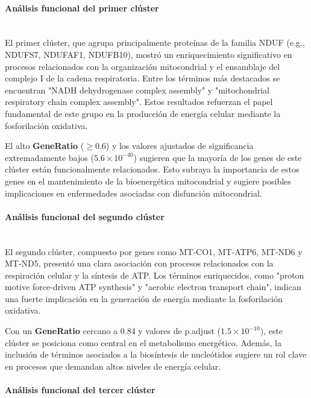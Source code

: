\paragraph{Análisis funcional del primer clúster} \mbox{}\\

El primer clúster, que agrupa principalmente proteínas de la familia NDUF (e.g., NDUFS7, NDUFAF1, NDUFB10), mostró un enriquecimiento significativo en procesos relacionados con la organización mitocondrial y el ensamblaje del complejo I de la cadena respiratoria. Entre los términos más destacados se encuentran "NADH dehydrogenase complex assembly" y "mitochondrial respiratory chain complex assembly". Estos resultados refuerzan el papel fundamental de este grupo en la producción de energía celular mediante la fosforilación oxidativa.

El alto \textbf{GeneRatio} (\(\geq 0.6\)) y los valores ajustados de significancia extremadamente bajos (\( 5.6 \times 10^{-40} \)) sugieren que la mayoría de los genes de este clúster están funcionalmente relacionados. Esto subraya la importancia de estos genes en el mantenimiento de la bioenergética mitocondrial y sugiere posibles implicaciones en enfermedades asociadas con disfunción mitocondrial.

\paragraph{Análisis funcional del segundo clúster} \mbox{}\\

El segundo clúster, compuesto por genes como MT-CO1, MT-ATP6, MT-ND6 y MT-ND5, presentó una clara asociación con procesos relacionados con la respiración celular y la síntesis de ATP. Los términos enriquecidos, como "proton motive force-driven ATP synthesis" y "aerobic electron transport chain", indican una fuerte implicación en la generación de energía mediante la fosforilación oxidativa.

Con un \textbf{GeneRatio} cercano a 0.84 y valores de p.adjust (\( 1.5 \times 10^{-10} \)), este clúster se posiciona como central en el metabolismo energético. Además, la inclusión de términos asociados a la biosíntesis de nucleótidos sugiere un rol clave en procesos que demandan altos niveles de energía celular.

\paragraph{Análisis funcional del tercer clúster} \mbox{}\\

